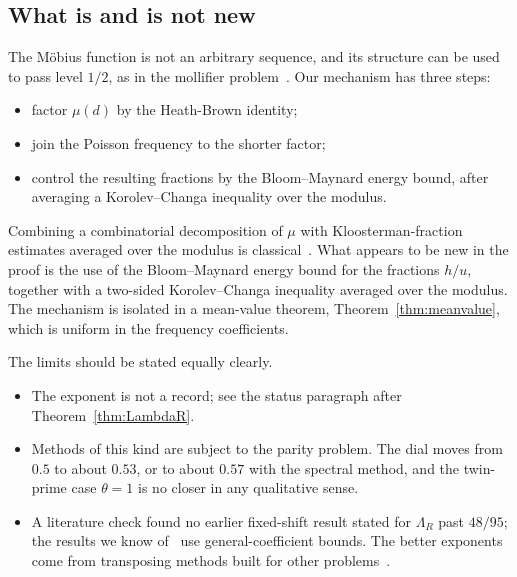 \documentclass[11pt]{amsart}
\theoremstyle{definition}
\theoremstyle{remark}
\numberwithin{equation}{section}
\begin{document}
\subsection{What is and is not new}\label{sec:significance}
The M\"obius function is not an arbitrary sequence, and its structure can be
used to pass level $1/2$, as in the mollifier
problem~\cite{BCHB,Con89}.  Our mechanism has three steps:
\begin{itemize}
\item factor $\mu(d)$ by the Heath-Brown identity;
\item join the Poisson frequency to the shorter factor;
\item control the resulting fractions by the Bloom--Maynard energy bound,
after averaging a Korolev--Changa inequality over the modulus.
\end{itemize}
Combining a combinatorial decomposition of $\mu$ with Kloosterman-fraction
estimates averaged over the modulus is classical~\cite{Con89,FS11,Irv14,PR18}.
What appears to be new in the proof is the use of the Bloom--Maynard energy
bound for the fractions $h/u$, together with a two-sided Korolev--Changa
inequality averaged over the modulus.  The mechanism is isolated in a
mean-value theorem, Theorem~\ref{thm:meanvalue}, which is uniform in the
frequency coefficients.

The limits should be stated equally clearly.
\begin{itemize}
\item The exponent is not a record; see the status paragraph after
Theorem~\ref{thm:LambdaR}.
\item Methods of this kind are subject to the parity problem.  The dial
moves from $0.5$ to about $0.53$, or to about $0.57$ with the spectral
method, and the twin-prime case $\theta=1$ is no closer in any qualitative
sense.
\item A literature check found no earlier fixed-shift result stated for
$\Lambda_R$ past $48/95$; the results we know of~\cite{CL,Walker} use
general-coefficient bounds.  The better exponents come from transposing
methods built for other problems~\cite{BCHB,Con89,Irv14,PR18}.
\end{itemize}
\end{document}
